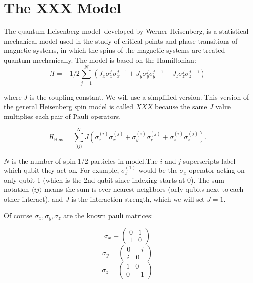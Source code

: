 \section{The XXX Model}\label{sec:xxx}

The quantum Heisenberg model, developed by Werner Heisenberg, is a statistical mechanical model used in the study of critical points and phase transitions of magnetic systems, in which the spins of the magnetic systems are treated quantum mechanically. The model is based on the Hamiltonian:
    \begin{equation}
        H = -1/2 \sum_{j=1}^{N} (J_x \sigma_x^{j} \sigma_x^{j+1} + J_y \sigma_y^{j} \sigma_y^{j+1} + J_z \sigma_z^{j} \sigma_z^{j+1})
     \end{equation}

     where $J$ is the coupling constant. We will use a simplified version. This version of the general Heisenberg spin model is called $XXX$ because the same $J$ value multiplies each pair of Pauli operators.




     \begin{equation}
        H_{\text{Heis}} = \sum_{\langle ij \rangle}^{N} J \left(\sigma_x^{(i)}\sigma_x^{(j)} + \sigma_y^{(i)}\sigma_y^{(j)} + \sigma_z^{(i)}\sigma_z^{(j)}\right).
     \end{equation}
    
    
    $N$ is the number of spin-1/2 particles in model.The $i$ and $j$ superscripts label which qubit they act on. For example, $\sigma_x^{(1)}$ would be the $\sigma_x$ operator acting on only qubit 1 (which is the 2nd qubit since indexing starts at 0). The sum notation $\langle ij \rangle$ means the sum is over nearest neighbors (only qubits next to each other interact), and $J$ is the interaction strength, which we will set $J=1$.

    

    Of course $\sigma_x, \sigma_y, \sigma_z$ are the known pauli matrices: 

\[
    \sigma_x =
    \begin{pmatrix}0&1\\1&0\end{pmatrix}
    \]
    \[
    \sigma_y =
    \begin{pmatrix}0&-i\\i&0\end{pmatrix} 
    \]
    \[
    \sigma_z =
    \begin{pmatrix}1&0\\0&-1\end{pmatrix} 
    \]


